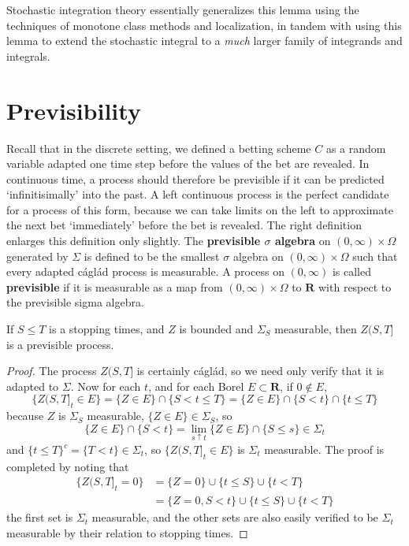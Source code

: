 Stochastic integration theory essentially generalizes this lemma using the techniques of monotone class methods and localization, in tandem with using this lemma to extend the stochastic integral to a {\it much} larger family of integrands and integrals.

\section{Previsibility}

Recall that in the discrete setting, we defined a betting scheme $C$ as a random variable adapted one time step before the values of the bet are revealed. In continuous time, a process should therefore be previsible if it can be predicted `infinitisimally' into the past. A left continuous process is the perfect candidate for a process of this form, because we can take limits on the left to approximate the next bet `immediately' before the bet is revealed. The right definition enlarges this definition only slightly. The {\bf previsible $\sigma$ algebra} on $(0,\infty) \times \Omega$ generated by $\Sigma$ is defined to be the smallest $\sigma$ algebra on $(0,\infty) \times \Omega$ such that every adapted c\'{a}gl\'{a}d process is measurable. A process on $(0,\infty)$ is called {\bf previsible} if it is measurable as a map from $(0,\infty) \times \Omega$ to $\mathbf{R}$ with respect to the previsible sigma algebra.

\begin{lemma}
    If $S \leq T$ is a stopping times, and $Z$ is bounded and $\Sigma_S$ measurable, then $Z(S,T]$ is a previsible process.
\end{lemma}
\begin{proof}
    The process $Z(S,T]$ is certainly c\'{a}gl\'{a}d, so we need only verify that it is adapted to $\Sigma$. Now for each $t$, and for each Borel $E \subset \mathbf{R}$, if $0 \not \in E$,
    \[ \{ Z(S,T]_t \in E \} = \{ Z \in E \} \cap \{ S < t \leq T \} = \{ Z \in E \} \cap \{ S < t \} \cap \{ t \leq T \} \]
    because $Z$ is $\Sigma_S$ measurable, $\{ Z \in E \} \in \Sigma_S$, so
    \[ \{ Z \in E \} \cap \{ S < t \} = \lim_{s \uparrow t} \{ Z \in E \} \cap \{ S \leq s \} \in \Sigma_t \]
    and $\{ t \leq T \}^c = \{ T < t \} \in \Sigma_t$, so $\{ Z(S,T]_t \in E \}$ is $\Sigma_t$ measurable. The proof is completed by noting that
    \begin{align*}
        \{ Z(S,T]_t = 0 \} &= \{ Z = 0 \} \cup \{ t \leq S \} \cup \{ t < T \}\\
        &= \{ Z = 0, S < t \} \cup \{ t \leq S \} \cup \{ t < T \}
    \end{align*}
    the first set is $\Sigma_t$ measurable, and the other sets are also easily verified to be $\Sigma_t$ measurable by their relation to stopping times.
\end{proof}

